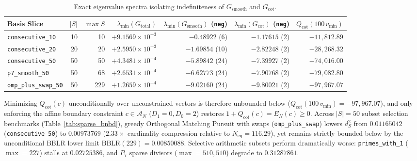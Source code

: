 \documentclass[11pt,a4paper]{article}
\theoremstyle{definition}
\begin{document}
\begin{table}[h!]
\centering
\footnotesize
\setlength{\tabcolsep}{4pt}
\begin{tabular}{@{}lrrrrrr@{}}
\toprule
\textbf{Basis Slice} & $|S|$ & $\max S$ & $\lambda_{\min}(G_{\mathrm{total}})$ & $\lambda_{\min}(G_{\mathrm{smooth}})$ (\texttt{neg}) & $\lambda_{\min}(G_{\mathrm{cot}})$ (\texttt{neg}) & $Q_{\mathrm{cot}}(100\,v_{\min})$ \\
\midrule
\texttt{consecutive\_10} & 10 & 10 & $+9.1569\times 10^{-3}$ & $-0.48922$ (6) & $-1.17615$ (2) & $-11{,}812.89$ \\
\texttt{consecutive\_20} & 20 & 20 & $+2.5950\times 10^{-3}$ & $-1.69854$ (10) & $-2.82248$ (2) & $-28{,}268.32$ \\
\texttt{consecutive\_50} & 50 & 50 & $+4.3481\times 10^{-4}$ & $-5.89842$ (24) & $-7.39927$ (2) & $-74{,}016.00$ \\
\texttt{p7\_smooth\_50} & 50 & 68 & $+2.6531\times 10^{-4}$ & $-6.62773$ (24) & $-7.90768$ (2) & $-79{,}082.80$ \\
\texttt{omp\_plus\_swap\_50} & 50 & 229 & $+1.2659\times 10^{-4}$ & $-9.02160$ (24) & $-9.80021$ (2) & $-97{,}967.07$ \\
\bottomrule
\end{tabular}
\caption{Exact eigenvalue spectra isolating indefiniteness of $G_{\mathrm{smooth}}$ and $G_{\mathrm{cot}}$.}
\label{tab:gram_indef}
\end{table}

Minimizing $Q_{\mathrm{cot}}(c)$ unconditionally over unconstrained vectors is therefore unbounded below ($Q_{\mathrm{cot}}(100\,v_{\min}) = -97{,}967.07$), and only enforcing the affine boundary constraint $c \in \mathcal{A}_N$ ($D_1 = 0, D_0 = 2$) restores $1 + Q_{\mathrm{cot}}(c) = E_N(c) \ge 0$. Across $|S| = 50$ subset selection benchmarks (Table~\ref{tab:sparse_bnbd}), greedy Orthogonal Matching Pursuit with swaps (\texttt{omp\_plus\_swap}) lowers $d_S^2$ from $0.01165042$ (\texttt{consecutive\_50}) to $0.00973769$ ($2.33\times$ cardinality compression relative to $N_{\mathrm{eq}} = 116.29$), yet remains strictly bounded below by the unconditional BBLR lower limit $\mathrm{BBLR}(229) = 0.00850088$. Selective arithmetic subsets perform dramatically worse: \texttt{primes\_with\_1} ($\max = 227$) stalls at $0.02725386$, and $P_7$ sparse divisors ($\max = 510{,}510$) degrade to $0.31287861$.
\end{document}
